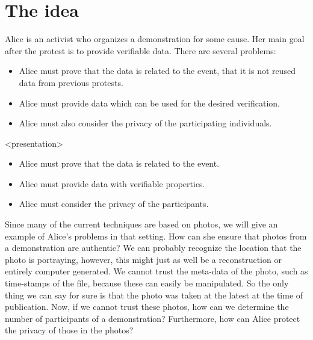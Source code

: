 \mode*
\section{The idea}%
\label{TheIdea}

Alice is an activist who organizes a demonstration for some cause.
Her main goal after the protest is to provide verifiable data.
There are several problems:
\begin{itemize}
  \item Alice must prove that the data is related to the event, that it is not 
    reused data from previous protests.
  \item Alice must provide data which can be used for the desired verification.
  \item Alice must also consider the privacy of the participating individuals.
\end{itemize}

\begin{frame}<presentation>
  \begin{itemize}
    \item Alice must prove that the data is related to the event.
    \item Alice must provide data with verifiable properties.
    \item Alice must consider the privacy of the participants.
  \end{itemize}
\end{frame}

Since many of the current techniques are based on photos, we will give an 
example of Alice's problems in that setting.
How can she ensure that photos from a demonstration are authentic?
We can probably recognize the location that the photo is portraying, however, 
this might just as well be a reconstruction or entirely computer generated.
We cannot trust the meta-data of the photo, such as time-stamps of the file, 
because these can easily be manipulated.
So the only thing we can say for sure is that the photo was taken at the latest 
at the time of publication.
Now, if we cannot trust these photos, how can we determine the number of 
participants of a demonstration?
Furthermore, how can Alice protect the privacy of those in the photos?

%
%
%

